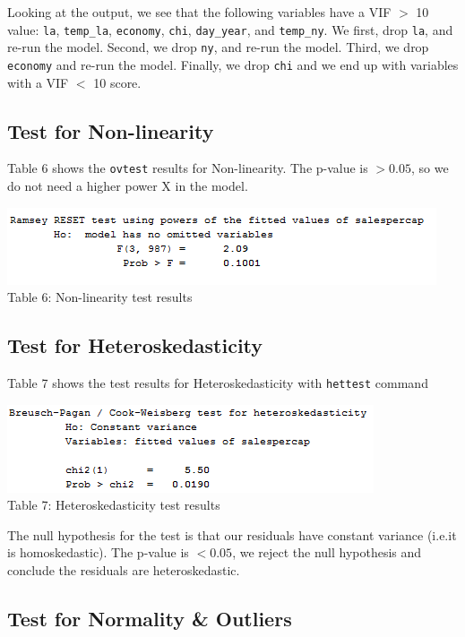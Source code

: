 \documentclass[10pt]{article}
\begin{document}
Looking at the output, we see that the following variables have a VIF $>$ 10 value: {\tt la}, {\tt temp\_la}, {\tt economy}, {\tt chi}, {\tt day\_year}, and {\tt temp\_ny}. We first, drop {\tt la}, and re-run the model. Second, we drop {\tt ny}, and re-run the model. Third, we drop {\tt economy} and re-run the model. Finally, we drop {\tt chi} and we end up with variables with a VIF $<$ 10 score. 

\subsection{Test for Non-linearity}

Table 6 shows the {\tt ovtest} results for Non-linearity. The p-value is $>0.05$, so we do not need a higher power X in the model. 
\begin{center}
\includegraphics[scale=0.8]{g20.png}\\
Table 6: Non-linearity test results
\end{center}

\subsection{Test for Heteroskedasticity}

Table 7 shows the test results for Heteroskedasticity with {\tt hettest} command

\begin{center}
\includegraphics[scale=0.8]{g21.png}\\
Table 7: Heteroskedasticity test results
\end{center}

The null hypothesis for the test is that our residuals have constant variance (i.e.it is homoskedastic). The p-value is $<0.05$, we reject the null hypothesis and conclude the residuals are heteroskedastic.

\subsection{Test for Normality \& Outliers }
 
\end{document}
